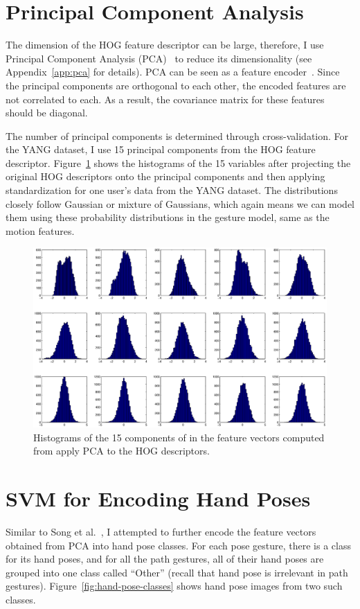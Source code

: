 \section{Principal Component Analysis}
The dimension of the HOG feature descriptor can be large, therefore, I use
Principal Component Analysis (PCA)~\cite{pca} to reduce its dimensionality (see
Appendix~\ref{app:pca} for details). PCA can be seen as a feature
encoder~\cite{ranzato07}. Since the principal components are orthogonal to each
other, the encoded features are not correlated to each. As a result, the
covariance matrix for these features should be diagonal.

The number of principal components is determined through cross-validation. For
the YANG dataset, I use 15 principal components from the HOG feature descriptor.
Figure~\ref{fig:pca} shows the histograms of the 15
variables after projecting the original HOG descriptors onto the principal
components and then applying standardization for one user's data from the YANG
dataset. The distributions closely follow Gaussian or mixture of
Gaussians, which again means
we can model them using these probability distributions in the gesture
model, same as the motion features.

\begin{figure}[tbh]
\includegraphics[width=\columnwidth]{figures/hist_pca.eps}
\caption{Histograms of the 15 components of in the feature vectors computed
from apply PCA to the HOG descriptors.}
\label{fig:pca}
\end{figure}

\section{SVM for Encoding Hand Poses}
Similar to Song et al.~\cite{song12}, I attempted to further encode the feature
vectors obtained from PCA into hand pose classes. For each pose
gesture, there is a class for its hand poses, and for all the path
gestures, all of their hand poses are grouped into one class called ``Other''
(recall that hand pose is irrelevant in path gestures).
Figure~\ref{fig:hand-pose-classes} shows hand pose images from two such classes.

